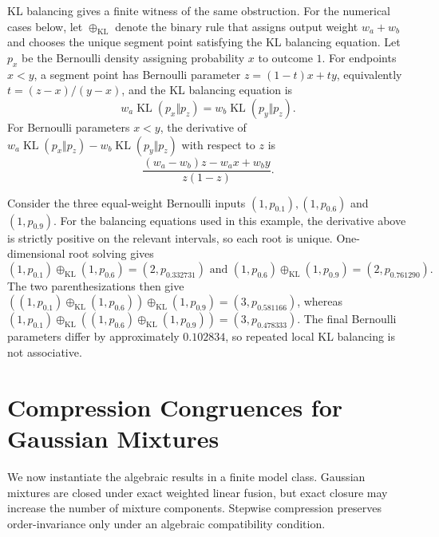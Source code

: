 \documentclass[runningheads]{llncs}
\newcommand{\KL}{\operatorname{KL}}
\begin{document}
KL balancing gives a finite witness of the same obstruction. For the numerical cases below, let $\oplus_{\KL}$ denote the binary rule that assigns output weight $w_a+w_b$ and chooses the unique segment point satisfying the KL balancing equation. Let $p_x$ be the Bernoulli density assigning probability $x$ to outcome $1$. For endpoints $x<y$, a segment point has Bernoulli parameter $z=(1-t)x+ty$, equivalently $t=(z-x)/(y-x)$, and the KL balancing equation is
\begin{equation*}
  w_a\KL(p_x\Vert p_z)=w_b\KL(p_y\Vert p_z).
\end{equation*}
For Bernoulli parameters $x<y$, the derivative of $w_a\KL(p_x\Vert p_z)-w_b\KL(p_y\Vert p_z)$ with respect to $z$ is
\begin{equation*}
  \frac{(w_a-w_b)z-w_ax+w_by}{z(1-z)}.
\end{equation*}
\begin{example}\label{ex:kl-nonassociative}
Consider the three equal-weight Bernoulli inputs $(1,p_{0.1}), (1,p_{0.6})$ and $(1,p_{0.9})$.
For the balancing equations used in this example, the derivative above is
strictly positive on the relevant intervals, so each root is unique.
One-dimensional root solving gives
\[(1,p_{0.1})\oplus_{\KL}(1,p_{0.6})=(2,p_{0.332731})\,
  \,\text{and}\,\,
  (1,p_{0.6})\oplus_{\KL}(1,p_{0.9})=(2,p_{0.761290}).\]
The two parenthesizations then give $((1,p_{0.1})\oplus_{\KL}(1,p_{0.6}))\oplus_{\KL}(1,p_{0.9})
  =(3,p_{0.581166})$, whereas $(1,p_{0.1})\oplus_{\KL}((1,p_{0.6})\oplus_{\KL}(1,p_{0.9}))
  =(3,p_{0.478333})$. The final Bernoulli parameters differ by approximately $0.102834$, so repeated local KL balancing is not associative.
\end{example}

\section{Compression Congruences for Gaussian Mixtures}\label{sec:gmm}
We now instantiate the algebraic results in a finite model class. Gaussian mixtures are closed under exact weighted linear fusion, but exact closure may
increase the number of mixture components. Stepwise compression preserves
order-invariance only under an algebraic compatibility condition.
\end{document}
